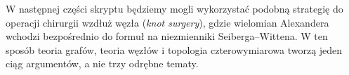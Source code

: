 W następnej części skryptu będziemy mogli wykorzystać
podobną strategię do operacji chirurgii wzdłuż węzła
(\emph{knot surgery}), gdzie wielomian Alexandera
wchodzi bezpośrednio do formuł na niezmienniki
Seiberga--Wittena. W ten sposób teoria grafów,
teoria węzłów i topologia czterowymiarowa tworzą
jeden ciąg argumentów, a nie trzy odrębne tematy.


